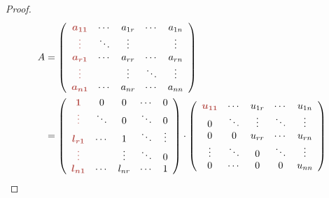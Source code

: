 \begin{proof}
    \begin{equation} \begin{aligned} A & =\left(\begin{array}{ c c c c c }
                \boldsymbol{\textcolor[rgb]{0.72,0.33,0.31}{a_{11}}}  & \cdots & a_{1r} & \cdots & a_{1n} \\
                \boldsymbol{\textcolor[rgb]{0.72,0.33,0.31}{\vdots }} & \ddots & \vdots &        & \vdots \\
                \boldsymbol{\textcolor[rgb]{0.72,0.33,0.31}{a_{r1}}}  & \cdots & a_{rr} & \cdots & a_{rn} \\
                \boldsymbol{\textcolor[rgb]{0.72,0.33,0.31}{\vdots }} &        & \vdots & \ddots & \vdots \\
                \boldsymbol{\textcolor[rgb]{0.72,0.33,0.31}{a_{n1}}}  & \cdots & a_{nr} & \cdots & a_{nn}
            \end{array}\right)                                               \\
                  & =\left(\begin{array}{ c c c c c }
                \boldsymbol{\textcolor[rgb]{0.72,0.33,0.31}{1}}       & 0      & 0      & \cdots & 0      \\
                \boldsymbol{\textcolor[rgb]{0.72,0.33,0.31}{\vdots }} & \ddots & 0      & \ddots & 0      \\
                \boldsymbol{\textcolor[rgb]{0.72,0.33,0.31}{l_{r1}}}  & \cdots & 1      & \ddots & \vdots \\
                \boldsymbol{\textcolor[rgb]{0.72,0.33,0.31}{\vdots }} &        & \vdots & \ddots & 0      \\
                \boldsymbol{\textcolor[rgb]{0.72,0.33,0.31}{l_{n1}}}  & \cdots & l_{nr} & \cdots & 1
            \end{array}\right) \cdot \left(\begin{array}{ c c c c c }
                \boldsymbol{\textcolor[rgb]{0.72,0.33,0.31}{u_{11}}} & \cdots & u_{1r} & \cdots & u_{1n} \\
                0                                                    & \ddots & \vdots & \ddots & \vdots \\
                0                                                    & 0      & u_{rr} & \cdots & u_{rn} \\
                \vdots                                               & \ddots & 0      & \ddots & \vdots \\
                0                                                    & \cdots & 0      & 0      & u_{nn}
            \end{array}\right)
        \end{aligned}\end{equation}
\end{proof}

